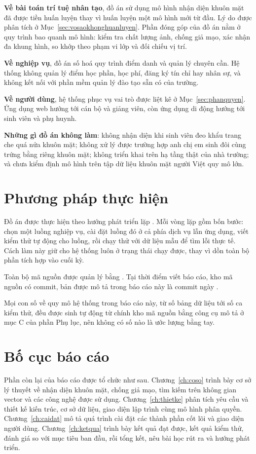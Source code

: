 \textbf{Về bài toán trí tuệ nhân tạo}, đồ án sử dụng mô hình nhận diện khuôn
mặt đã được tiền huấn luyện thay vì huấn luyện một mô hình mới từ đầu. Lý do
được phân tích ở Mục~\ref{sec:vosaokhonghuanluyen}. Phần đóng góp của đồ án
nằm ở quy trình bao quanh mô hình: kiểm tra chất lượng ảnh, chống giả mạo,
xác nhận đa khung hình, so khớp theo phạm vi lớp và đối chiếu vị trí.

\textbf{Về nghiệp vụ}, đồ án số hoá quy trình điểm danh và quản lý chuyên
cần. Hệ thống không quản lý điểm học phần, học phí, đăng ký tín chỉ hay
nhân sự, và không kết nối với phần mềm quản lý đào tạo sẵn có của trường.

\textbf{Về người dùng}, hệ thống phục vụ \FsoVaiTro{} vai trò được liệt kê ở
Mục~\ref{sec:phanquyen}. Ứng dụng web hướng tới cán bộ và giảng viên, còn
ứng dụng di động hướng tới sinh viên và phụ huynh.

\textbf{Những gì đồ án không làm}: không nhận diện khi sinh viên đeo khẩu
trang che quá nửa khuôn mặt; không xử lý được trường hợp anh chị em sinh đôi
cùng trứng bằng riêng khuôn mặt; không triển khai trên hạ tầng thật của nhà
trường; và chưa kiểm định mô hình trên tập dữ liệu khuôn mặt người Việt quy
mô lớn.

\section{Phương pháp thực hiện}

Đồ án được thực hiện theo hướng phát triển lặp \cite{Larman2003Iterative}. Mỗi vòng lặp gồm bốn bước:
chọn một luồng nghiệp vụ, cài đặt luồng đó ở cả phía dịch vụ lẫn ứng dụng,
viết kiểm thử tự động cho luồng, rồi chạy thử với dữ liệu mẫu để tìm lỗi
thực tế. Cách làm này giữ cho hệ thống luôn ở trạng thái chạy được, thay vì
dồn toàn bộ phần tích hợp vào cuối kỳ.

Toàn bộ mã nguồn được quản lý bằng . Tại thời điểm viết báo cáo,
kho mã nguồn có \FsoCommit{} commit, bản được mô tả trong báo cáo này là
commit \code{\FcommitCuoi} ngày \FngayCommit.

\begin{ghinho}
Mọi con số về quy mô hệ thống trong báo cáo này, từ số bảng dữ liệu tới số
ca kiểm thử, đều được sinh tự động từ chính kho mã nguồn bằng công cụ mô tả
ở mục C của phần Phụ lục, nên không có số nào là ước lượng bằng tay.
\end{ghinho}

\section{Bố cục báo cáo}

Phần còn lại của báo cáo được tổ chức như sau. Chương~\ref{ch:coso} trình
bày cơ sở lý thuyết về nhận diện khuôn mặt, chống giả mạo, tìm kiếm trên
không gian vector và các công nghệ được sử dụng. Chương~\ref{ch:thietke}
phân tích yêu cầu và thiết kế kiến trúc, cơ sở dữ liệu, giao diện lập trình
cùng mô hình phân quyền. Chương~\ref{ch:caidat} mô tả quá trình cài đặt các
thành phần cốt lõi và giao diện người dùng. Chương~\ref{ch:ketqua} trình bày
kết quả đạt được, kết quả kiểm thử, đánh giá so với mục tiêu ban đầu, rồi
tổng kết, nêu bài học rút ra và hướng phát triển.
